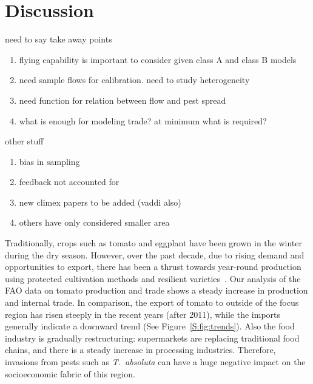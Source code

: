 \documentclass[11pt]{article}
\newcommand{\tuta}{\emph{T.~absoluta}}
\theoremstyle{definition}
\begin{document}
\section{Discussion}

need to say take away points
\begin{enumerate}
    \item flying capability is important to consider given class A and
    class B models
    \item need sample flows for calibration. need to study heterogeneity
    \item need function for relation between flow and pest spread
    \item what is enough for modeling trade? at minimum what is
    required?
\end{enumerate}
other stuff
\begin{enumerate}
    \item bias in sampling
    \item feedback not accounted for
    \item new climex papers to be added (vaddi also)
    \item others have only considered smaller area
\end{enumerate}

Traditionally, crops such as tomato and eggplant have been grown in the
winter during the dry season. However, over the past decade, due to rising
demand and opportunities to export, there has been a thrust towards
year-round production using protected cultivation methods and resilient
varieties~\cite{ali2001}. Our analysis of the FAO data on
tomato production and trade shows a steady increase in production and
internal trade. In comparison, the export of tomato to outside of the focus
region has risen steeply in the recent years (after 2011), while the
imports generally indicate a downward trend (See
Figure~\ref{S:fig:trends}). Also the food industry is gradually
restructuring: supermarkets are replacing traditional food chains, and
there is a steady increase in processing industries. Therefore, invasions
from pests such as \tuta{} can have a huge negative impact on the
socioeconomic fabric of this region.
\end{document}
